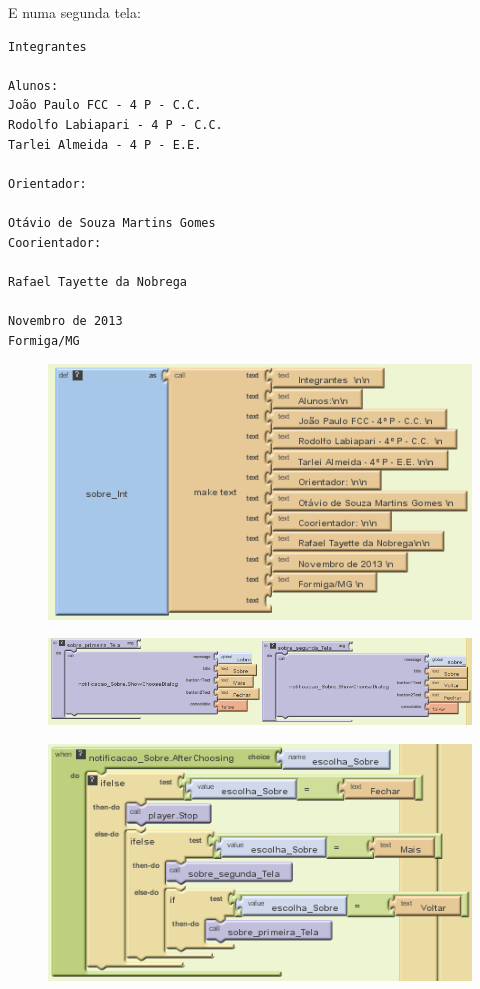 \documentclass[portugues, brazil, a4paper,12pt]{article}
\begin{document}
E numa segunda tela:
\begin{verbatim}
Integrantes

Alunos:
João Paulo FCC - 4 P - C.C.
Rodolfo Labiapari - 4 P - C.C.
Tarlei Almeida - 4 P - E.E.

Orientador:

Otávio de Souza Martins Gomes
Coorientador:

Rafael Tayette da Nobrega

Novembro de 2013
Formiga/MG
\end{verbatim}

\begin{figure}[H]
	\centering
	\includegraphics[scale=.8]{img/controle/textos2.png}
	
\end{figure}

\begin{figure}[H]
	\centering
	\includegraphics[scale=.8]{img/controle/sobre1.png}
	
\end{figure}


\begin{figure}[H]
	\centering
	\includegraphics[scale=.8]{img/controle/sobre2.png}
	
\end{figure}
\end{document}

